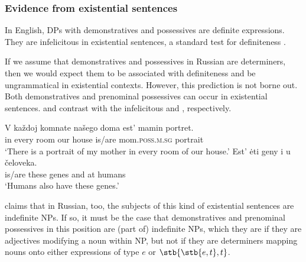 \documentclass[output=paper]{langscibook}
\begin{document}

\subsubsection{Evidence from existential sentences}

In English, DPs with demonstratives and possessives are definite expressions. They are infelicitous in existential sentences, a standard test for definiteness \citep{Milsark1977,Bach1987}.


\ea\label{standard_definiteness}
\z\z 

\noindent If we assume that demonstratives and possessives in Russian are determiners, then we would expect them to be associated with definiteness and be ungrammatical in existential contexts. However, this prediction is not borne out. Both demonstratives and prenominal possessives can occur in existential sentences.  and  contrast with the infelicitous  and , respectively.


\ea 
    \ea\label{32_a} \gll V každoj komnate našego doma est' mamin portret.\\
    in every room our house is/are mom.\textsc{poss.m.sg} portrait\\
    \glt `There is a portrait of my mother in every room of our house.'
    \ex\label{32_b} \gll Est' ėti geny i u čeloveka.\\
    is/are these genes and at humans\\
    \glt `Humans also have these genes.'
\z\z

\noindent \citet{Paduceva2000} claims that in Russian, too, the subjects of this kind of existential sentences are indefinite NPs. If so, it must be the case that demonstratives and prenominal possessives in this position are (part of) indefinite NPs, which they are if they are adjectives modifying a noun within NP, but not if they are determiners mapping nouns onto either expressions of type $e$ or $\stb{\stb{e,t}, t}$.                                             
\end{document}
